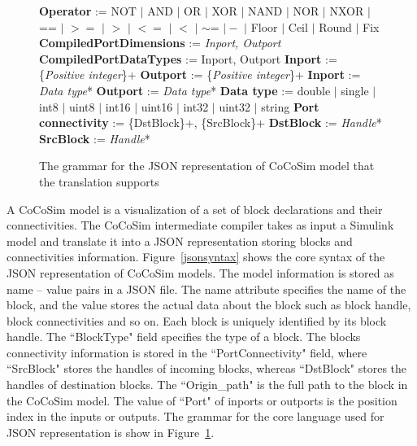 \documentclass{article}
\begin{document}
\begin{figure}
\begin{algorithmic}
\State \textbf{Operator} := NOT $\mid$ AND $\mid$ OR $\mid$ XOR $\mid$ NAND $\mid$ NOR $\mid$ NXOR 
\State {\ \ \ \ \ \ \ \ \ \ \ \ \ \ \ \ \ \ } $\mid$ == $\mid$ $>=$ $\mid$ $>$ $\mid$ $<=$ $\mid$ $<$ $\mid$ $\sim$= $\mid -$ $\mid$ Floor $\mid$ Ceil $\mid$ Round $\mid$ Fix
\State \textbf{CompiledPortDimensions} := \textit{Inport, Outport}
\State \textbf{CompiledPortDataTypes} := \textsf{Inport, Outport}
\State \textbf{Inport} := \{\textit{Positive integer}\}+
\State \textbf{Outport} := \{\textit{Positive integer}\}+
\State \textbf{\textsf{Inport}} := \textit{Data type}*
\State \textbf{\textsf{Outport}} := \textit{Data type}*
\State \textbf{Data type} := double $\mid$ single $\mid$ int8 $\mid$ uint8 $\mid$ int16 $\mid$ uint16 $\mid$ int32 $\mid$ uint32 $\mid$ string
\State \textbf{Port connectivity} := \{DstBlock\}+, \{SrcBlock\}+
\State \textbf{DstBlock} := \textit{Handle}*
\State \textbf{SrcBlock} := \textit{Handle}*

\end{algorithmic}
\caption{The grammar for the JSON representation of CoCoSim model that the translation supports}
\label{jsongrammar}
\end{figure}

A CoCoSim model is a visualization of a set of block declarations and their connectivities.
The CoCoSim intermediate compiler takes as input a Simulink model and translate it into a JSON representation storing blocks and connectivities information. 
Figure~\ref{jsonsyntax} shows the core syntax of the JSON representation of CoCoSim models.
The model information is stored as name -- value pairs in a JSON file. 
The name attribute specifies the name of the block, and the value stores the actual data about the block such as block handle, block connectivities and so on. 
Each block is uniquely identified by its block handle.
The \textsf{``BlockType"} field specifies the type of a block. 
The blocks connectivity information is stored in the \textsf{``PortConnectivity"} field, where \textsf{``SrcBlock"} stores the handles of incoming blocks, whereas \textsf{``DstBlock"} stores the handles of destination blocks. 
The \textsf{``Origin\_path"} is the full path to the block in the CoCoSim model.
The value of \textsf{``Port"} of inports or outports is the position index in the inputs or outputs. 
The grammar for the core language used for JSON representation is show in Figure~\ref{jsongrammar}.
\end{document}
